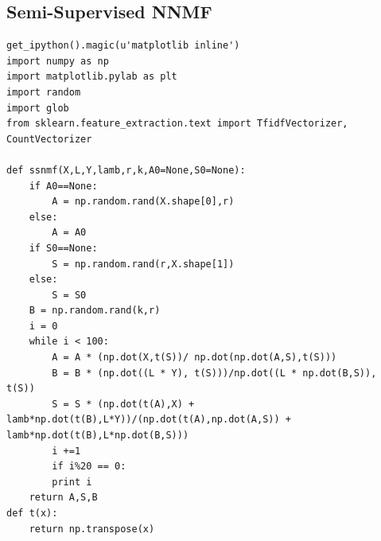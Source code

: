 \documentclass[12pt]{pom_thesis}
\begin{document}
\subsection*{Semi-Supervised NNMF}
\begin{lstlisting}
get_ipython().magic(u'matplotlib inline')
import numpy as np
import matplotlib.pylab as plt
import random
import glob
from sklearn.feature_extraction.text import TfidfVectorizer, CountVectorizer

def ssnmf(X,L,Y,lamb,r,k,A0=None,S0=None):
	if A0==None: 
		A = np.random.rand(X.shape[0],r)
	else:
		A = A0
	if S0==None:
		S = np.random.rand(r,X.shape[1])
	else:
		S = S0
	B = np.random.rand(k,r)
	i = 0  
	while i < 100:
		A = A * (np.dot(X,t(S))/ np.dot(np.dot(A,S),t(S)))
		B = B * (np.dot((L * Y), t(S)))/np.dot((L * np.dot(B,S)), t(S))
		S = S * (np.dot(t(A),X) + lamb*np.dot(t(B),L*Y))/(np.dot(t(A),np.dot(A,S)) + lamb*np.dot(t(B),L*np.dot(B,S)))
		i +=1
		if i%20 == 0:
		print i
	return A,S,B
def t(x):
	return np.transpose(x)
\end{lstlisting}
\end{document}
